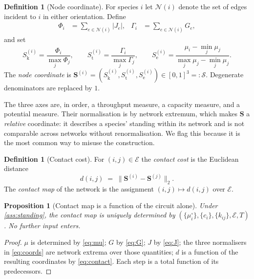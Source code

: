 \documentclass[11pt,twocolumn,a4paper]{article}
\theoremstyle{plain}
\newtheorem{proposition}[theorem]{Proposition}
\theoremstyle{definition}
\newtheorem{definition}[theorem]{Definition}
\theoremstyle{remark}
\newcommand{\Sspace}{\mathcal{S}}
\newcommand{\Sk}{S_{\mathrm{k}}}
\newcommand{\St}{S_{\mathrm{t}}}
\newcommand{\Se}{S_{\mathrm{e}}}
\newcommand{\Scoord}{\mathbf{S}}
\begin{document}
\begin{definition}[Node coordinate]
\label{def:sentropy}
For species $i$ let $\mathcal{N}(i)$ denote the set of edges incident to $i$ in
either orientation. Define
\begin{align}
\Phi_i &= \textstyle\sum_{e\in\mathcal{N}(i)} |J_e|, &
\Gamma_i &= \textstyle\sum_{e\in\mathcal{N}(i)} G_e,
\end{align}
and set
\begin{equation}
\Sk^{(i)} = \frac{\Phi_i}{\max_j \Phi_j},\qquad
\St^{(i)} = \frac{\Gamma_i}{\max_j \Gamma_j},\qquad
\Se^{(i)} = \frac{\mu_i - \min_j\mu_j}{\max_j\mu_j - \min_j\mu_j}.
\label{eq:coords}
\end{equation}
The \emph{node coordinate} is
$\Scoord^{(i)} = (\Sk^{(i)},\St^{(i)},\Se^{(i)}) \in [0,1]^3 =: \Sspace$.
Degenerate denominators are replaced by $1$.
\end{definition}

The three axes are, in order, a throughput measure, a capacity measure, and a
potential measure. Their normalisation is by network extremum, which makes
$\Scoord$ a \emph{relative} coordinate: it describes a species' standing within
its network and is not comparable across networks without renormalisation. We
flag this because it is the most common way to misuse the construction.

\begin{definition}[Contact cost]
\label{def:contact}
For $(i,j)\in\mathcal{E}$ the \emph{contact cost} is the Euclidean distance
\begin{equation}
d(i,j) \;=\; \bigl\| \Scoord^{(i)} - \Scoord^{(j)} \bigr\|_2 .
\label{eq:contact}
\end{equation}
The \emph{contact map} of the network is the assignment $(i,j)\mapsto d(i,j)$
over $\mathcal{E}$.
\end{definition}

\begin{proposition}[Contact map is a function of the circuit alone]
\label{prop:contact-determined}
Under \cref{ass:standing}, the contact map is uniquely determined by
$(\{\mu_i^\circ\},\{c_i\},\{k_{ij}\},\mathcal{E},T)$. No further input enters.
\end{proposition}

\begin{proof}
$\mu$ is determined by \cref{eq:mu}; $G$ by \cref{eq:G}; $J$ by \cref{eq:J};
the three normalisers in \cref{eq:coords} are network extrema over those
quantities; $d$ is a function of the resulting coordinates by \cref{eq:contact}.
Each step is a total function of its predecessors.
\end{proof}
\end{document}
